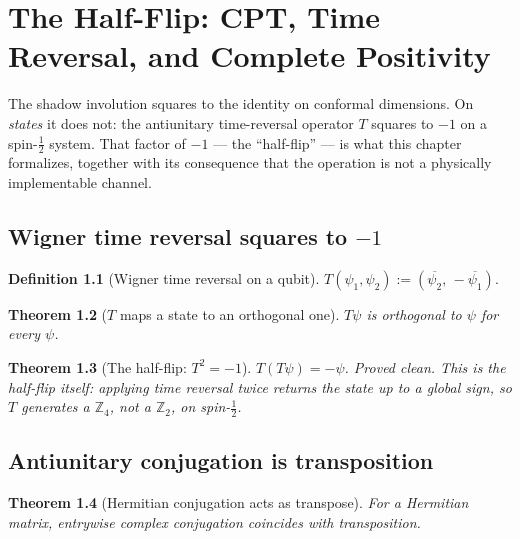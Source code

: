 \documentclass{report}
\newtheorem{theorem}{Theorem}[chapter]
\theoremstyle{definition}
\newtheorem{definition}[theorem]{Definition}
\begin{document}
\chapter{The Half-Flip: CPT, Time Reversal, and Complete Positivity}

The shadow involution squares to the identity on conformal dimensions. On \emph{states}
it does not: the antiunitary time-reversal operator $T$ squares to $-1$ on a
spin-$\tfrac12$ system. That factor of $-1$ --- the ``half-flip'' --- is what this
chapter formalizes, together with its consequence that the operation is not a physically
implementable channel.

\section{Wigner time reversal squares to $-1$}

\begin{definition}[Wigner time reversal on a qubit]
  \label{def:wignerT}
  \leanok
  $T(\psi_1,\psi_2) := (\overline{\psi_2},\, -\overline{\psi_1})$.
\end{definition}

\begin{theorem}[$T$ maps a state to an orthogonal one]
  \label{thm:wignerT-orthogonal}
  \leanok
  $T\psi$ is orthogonal to $\psi$ for every $\psi$.
\end{theorem}

\begin{theorem}[The half-flip: $T^2 = -1$]
  \label{thm:wignerT-squared}
  \leanok
  $T(T\psi) = -\psi$. \emph{Proved clean.} This is the half-flip itself: applying time
  reversal twice returns the state up to a global sign, so $T$ generates a
  $\mathbb{Z}_4$, not a $\mathbb{Z}_2$, on spin-$\tfrac12$.
\end{theorem}

\section{Antiunitary conjugation is transposition}

\begin{theorem}[Hermitian conjugation acts as transpose]
  \label{thm:hermitian-star-transpose}
  \leanok
  For a Hermitian matrix, entrywise complex conjugation coincides with transposition.
\end{theorem}
\end{document}
